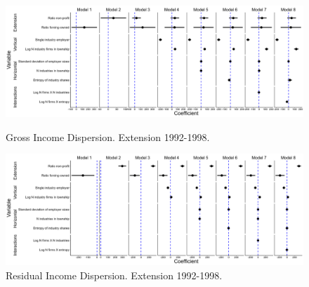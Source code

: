 \documentclass{article}
\begin{document}
\begin{figure}[htbp]
\centering
\includegraphics[width=1\textwidth]{grossvar_extension_1998_update.png}
\caption{Gross Income Dispersion.  Extension 1992-1998.}
\label{fig:gross_income}
  
  \vspace{1cm} %

\includegraphics[width=1\textwidth]{resvar_extension_1998_update.png}
\caption{Residual Income Dispersion.  Extension 1992-1998.}  
\label{fig:residual_income}
\end{figure}




\clearpage %
\thispagestyle{empty} %
\end{document}
